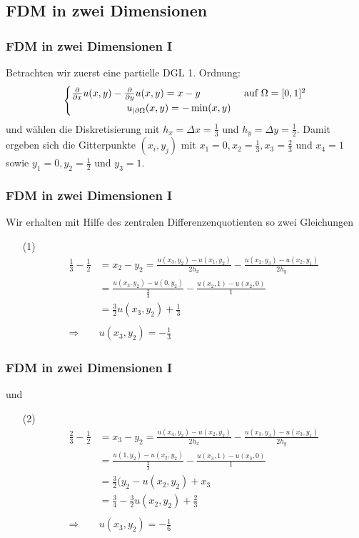 \subsection{FDM in zwei Dimensionen}
%
\begin{frame}\frametitle{FDM in zwei Dimensionen I}
Betrachten wir zuerst eine partielle DGL 1. Ordnung:
$$
\begin{cases} \frac{\partial}{\partial x} u(x,y)-\frac{\partial}{\partial y}u(x,y)= x-y & \text{ auf } \Omega=[0,1]^2\\ \hspace{19.5mm}u_{|\partial \Omega}(x,y)=-\min(x,y) \end{cases}
$$
und wählen die Diskretisierung mit $h_x=\Delta x = \frac{1}{3}$ und $h_y=\Delta y=\frac{1}{2}$. Damit ergeben sich die Gitterpunkte $(x_i,y_j)$ mit $x_1=0, x_2=\frac{1}{3}, x_3=\frac{2}{3}$ und $x_4=1$ sowie $y_1=0, y_2=\frac{1}{2}$ und $y_3=1$.\\	
\end{frame}
%
%
\begin{frame}\frametitle{FDM in zwei Dimensionen I}
Wir erhalten mit Hilfe des zentralen Differenzenquotienten so zwei Gleichungen
\begin{itemize}
\item[(1)]
\begin{align*}
\frac{1}{3}-\frac{1}{2}&=x_2-y_2=\frac{u(x_3,y_2)-u(x_1,y_2)}{2h_x}-\frac{u(x_2,y_3)-u(x_2,y_1)}{2h_y}\\
&=\frac{u(x_3,y_2)-u(0,y_2)}{\frac{2}{3}}-\frac{u(x_2,1)-u(x_2,0)}{1}\\
&=\frac{3}{2}u(x_3,y_2)+\frac{1}{3}\\
&\\
\Longrightarrow\quad  & u(x_3,y_2)= -\frac{1}{3} 
\end{align*}
\end{itemize}
\end{frame}
%
%
\begin{frame}\frametitle{FDM in zwei Dimensionen I}
und
\begin{itemize}
\item[(2)]
\begin{align*}
\frac{2}{3}-\frac{1}{2}&=x_3-y_2=\frac{u(x_4,y_2)-u(x_2,y_2)}{2h_x}-\frac{u(x_3,y_3)-u(x_3,y_1)}{2h_y}\\
&=\frac{u(1,y_2)-u(x_2,y_2)}{\frac{2}{3}}-\frac{u(x_3,1)-u(x_3,0)}{1}\\
&=\frac{3}{2}(y_2-u(x_2,y_2)+x_3\\
&=\frac{3}{4}-\frac{3}{2}u(x_2,y_2)+\frac{2}{3}\\
&\\
\Longrightarrow\quad  & u(x_3,y_2)= -\frac{1}{6} 
\end{align*}
\end{itemize}
\end{frame}
